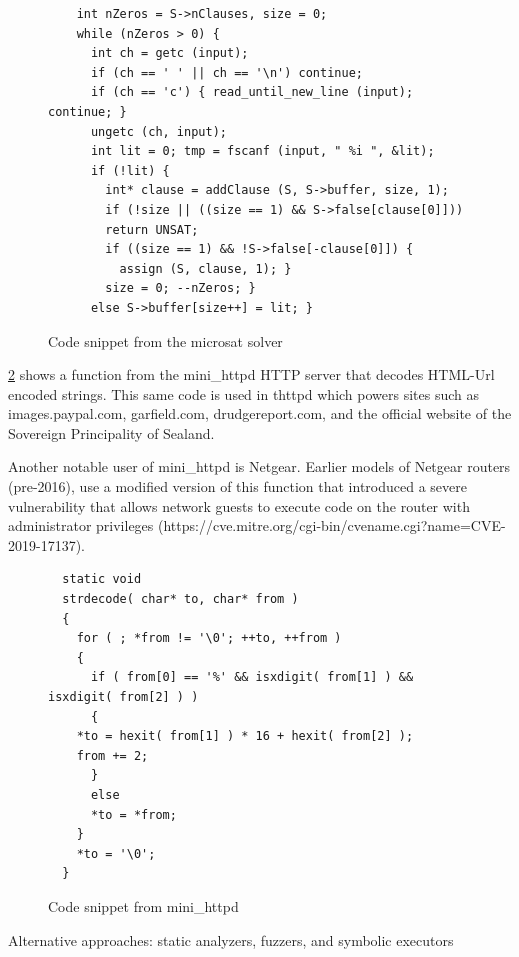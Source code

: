 \documentclass[letterpaper]{article}
\begin{document}
\begin{figure}
  \centering
  \begin{lstlisting}
    int nZeros = S->nClauses, size = 0;                     
    while (nZeros > 0) {                          
      int ch = getc (input);
      if (ch == ' ' || ch == '\n') continue;
      if (ch == 'c') { read_until_new_line (input); continue; }
      ungetc (ch, input);
      int lit = 0; tmp = fscanf (input, " %i ", &lit);      
      if (!lit) {                                           
        int* clause = addClause (S, S->buffer, size, 1);  
        if (!size || ((size == 1) && S->false[clause[0]]))  
        return UNSAT;                                   
        if ((size == 1) && !S->false[-clause[0]]) {  
          assign (S, clause, 1); }            
        size = 0; --nZeros; }
      else S->buffer[size++] = lit; }
  \end{lstlisting}
   \caption{Code snippet from the microsat solver}
  \label{fig:microsat}
\end{figure}

\ref{fig:minihttpd} shows a function from the mini\_httpd
HTTP server that decodes HTML-Url encoded strings. This
same code is used in thttpd which powers sites such as
images.paypal.com, garfield.com, drudgereport.com, and
the official website of the Sovereign Principality of Sealand.

Another notable user of mini\_httpd is Netgear. Earlier
models of Netgear routers (pre-2016), use a modified version of this
function that introduced a severe vulnerability that allows network
guests to execute code on the router with administrator privileges
(https://cve.mitre.org/cgi-bin/cvename.cgi?name=CVE-2019-17137).


\begin{figure}
  \centering
  \begin{lstlisting}
  static void
  strdecode( char* to, char* from )
  {
    for ( ; *from != '\0'; ++to, ++from )
    {
      if ( from[0] == '%' && isxdigit( from[1] ) && isxdigit( from[2] ) )
      {
	*to = hexit( from[1] ) * 16 + hexit( from[2] );
	from += 2;
      }
      else
      *to = *from;
    }
    *to = '\0';
  }
  \end{lstlisting}
  \caption{Code snippet from mini\_httpd}
  \label{fig:minihttpd}
\end{figure}

Alternative approaches: static analyzers, fuzzers,
and symbolic executors

\end{document}
